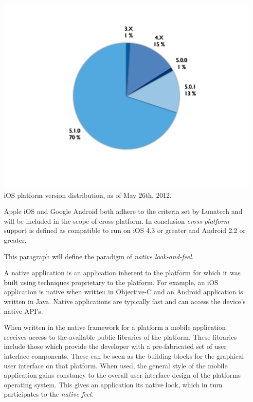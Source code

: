 \begin{centering}
\includegraphics[scale=0.25]{images/iosversionchart.png}\\{iOS platform version distribution, as of May 26th, 2012.\cite{Sylvain2012}}\\
\end{centering}



Apple iOS and Google Android both adhere to the criteria set by Lunatech and will be included in the scope of cross-platform. In conclusion \emph{cross-platform} support is defined as compatible to run on iOS 4.3 or greater and Android 2.2 or greater.


This paragraph will define the paradigm of \emph{native look-and-feel}.

A native application is an application inherent to the platform for which it was built using techniques proprietary to the platform. For example, an iOS application is native when written in Objective-C and an Android application is written in Java.  Native applications are typically fast and can access the device's native API's.

When written in the native framework for a platform a mobile application receives access to the available public libraries of the platform. These libraries include those which provide the developer with a pre-fabricated set of user interface components. These can be seen as the building blocks for the graphical user interface on that platform. When used, the general style of the mobile application gains constancy to the overall user interface design of the platforms operating system. This gives an application its native look, which in turn participates to the \emph{native feel}.

